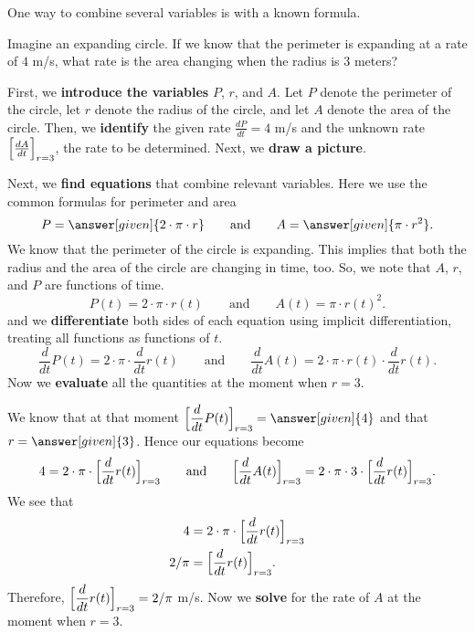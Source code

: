 \documentclass{ximera}
\begin{document}
One way to combine several variables is with a known formula.

\begin{example}
  Imagine an expanding circle. If we know that the perimeter is
  expanding at a rate of $4$ m/s, what rate is the area changing
  when the radius is $3$ meters?
  \begin{explanation}
   First, we \textbf{introduce the variables} $P$, $r$, and $A$. Let $P$ denote the perimeter of the circle, let $r$ denote the radius of the circle, and  let $A$ denote the area of the circle. Then, we \textbf{identify} the given rate $\frac{dP}{dt}=4$ m/s and the unknown rate $\Bigl[\frac{dA}{dt}\Bigr]_{r=3}$, the rate to be determined. 
    Next, we \textbf{draw a picture}.
    \begin{image}
    \end{image}
   Next, we \textbf{find equations} that combine relevant
   variables. Here we use the common formulas for perimeter and area
    \[
    P = \answer[given]{2\cdot \pi \cdot r}
    \qquad\text{and}\qquad
    A = \answer[given]{\pi \cdot r^2}.
    \]
   We know that the perimeter of the circle is expanding. This implies that both the radius and the area of the circle are changing in time, too.
    So, we note that $A$, $r$, and $P$ are functions of time. 
    \[
    P(t) = 2\cdot \pi \cdot r(t)
    \qquad\text{and}\qquad
    A(t) = \pi \cdot r(t)^2.
    \]
    and we \textbf{differentiate} both sides of each equation using implicit
    differentiation, treating all functions as functions of $t$.
    \[
    \dfrac{d}{dt}P(t) = 2\cdot \pi\cdot  \dfrac{d}{dt}r(t)
    \qquad\text{and}\qquad
     \dfrac{d}{dt}A(t) = 2\cdot \pi\cdot r(t) \cdot  \dfrac{d}{dt}r(t).
    \]
    Now we \textbf{evaluate} all the quantities at the moment when $r=3$.
    
     We know  that at that moment $\Bigl[ \dfrac{d}{dt}P(t)\Bigr]_{r=3} =
    \answer[given]{4}$ and that $r = \answer[given]{3}$. Hence our
    equations become
    \[
    4 = 2\cdot \pi\cdot \Bigl[\dfrac{d}{dt}r(t)\Bigr]_{r=3}
    \qquad\text{and}\qquad
   \Bigl[ \dfrac{d}{dt}A(t)\Bigr]_{r=3} = 2\cdot \pi\cdot 3 \cdot \Bigl[\dfrac{d}{dt}r(t)  \Bigl]_{r=3}.
    \]
    We see that
    \begin{align*}
       4 &= 2\cdot \pi\cdot \Bigl[\dfrac{d}{dt}r(t)\Bigr]_{r=3}\\
      2/\pi &=  \Bigl[\dfrac{d}{dt}r(t)\Bigr]_{r=3}.
    \end{align*}
    Therefore, $\Bigl[\dfrac{d}{dt}r(t)\Bigr]_{r=3}= 2/\pi$ m/s.
   Now we \textbf{solve} for the rate of $A$ at the moment when $r=3$.
   

\end{explanation}
\end{example}
\end{document}
